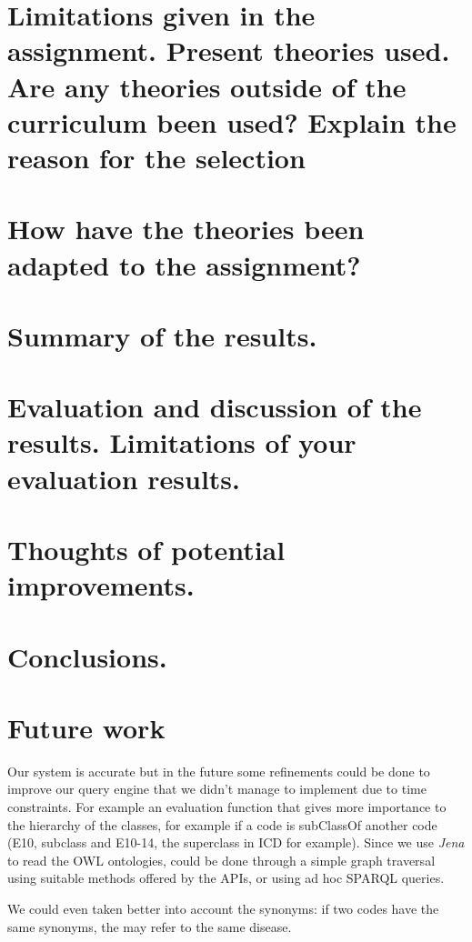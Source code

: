 \documentclass{article}
\begin{document}
\section{Limitations given in the assignment. Present theories used. Are any theories outside of the curriculum been used? Explain the reason for the selection}
\section{How have the theories been adapted to the assignment?}
\section{Summary of the results.}
\section{Evaluation and discussion of the results. Limitations of your evaluation results.}
\section{Thoughts of potential improvements.}
\section{Conclusions.}

\section{Future work}
Our system is accurate but in the future some refinements could be done to improve our query engine that we didn't manage to implement due to time constraints. For example an evaluation function that gives more  importance to the hierarchy of the classes, for example if a code is subClassOf another code (E10, subclass and E10-14, the superclass in ICD for example). Since we use \emph{Jena} to read the OWL ontologies, could be done through a simple graph traversal using suitable methods offered by the APIs, or using ad hoc SPARQL queries.

We could even taken better into account the synonyms: if two codes have the same synonyms, the may refer to the same disease.
\end{document}
